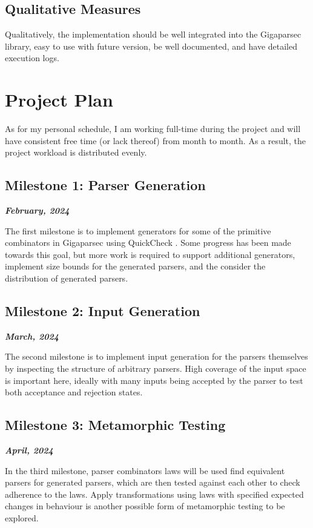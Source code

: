 \documentclass{article}
\newcommand{\be}[1]{\textbf{\emph{#1}}}
\begin{document}
\subsection{Qualitative Measures}

Qualitatively, the implementation should be well integrated into the Gigaparsec library, easy to use with future version, be well documented, and have detailed execution logs.

\section{Project Plan} %

As for my personal schedule, I am working full-time during the project and will have consistent free time (or lack thereof) from month to month. As a result, the project workload is distributed evenly.

\subsection{Milestone 1: Parser Generation}
\be{February, 2024}

The first milestone is to implement generators for some of the primitive combinators in Gigaparsec using QuickCheck \cite{quickcheck}. Some progress has been made towards this goal, but more work is required to support additional generators, implement size bounds for the generated parsers, and the consider the distribution of generated parsers.

\subsection{Milestone 2: Input Generation}
\be{March, 2024}

The second milestone is to implement input generation for the parsers themselves by inspecting the structure of arbitrary parsers. High coverage of the input space is important here, ideally with many inputs being accepted by the parser to test both acceptance and rejection states.

\subsection{Milestone 3: Metamorphic Testing}
\be{April, 2024}

In the third milestone, parser combinators laws will be used find equivalent parsers for generated parsers, which are then tested against each other to check adherence to the laws. Apply transformations using laws with specified expected changes in behaviour is another possible form of metamorphic testing to be explored.
\end{document}

